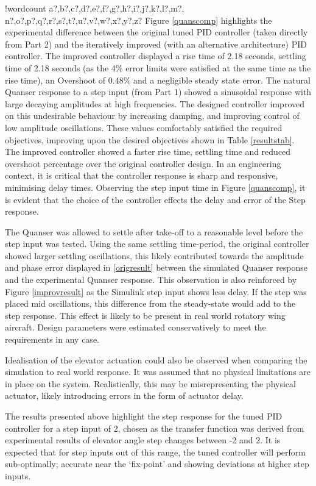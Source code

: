 \documentclass[11pt]{article}
\newcounter{words}
\newenvironment{counted}{%
  \setcounter{words}{0}
  \SearchList!{wordcount}{\stepcounter{words}}
    {a?,b?,c?,d?,e?,f?,g?,h?,i?,j?,k?,l?,m?,
    n?,o?,p?,q?,r?,s?,t?,u?,v?,w?,x?,y?,z?}
  \UndoBoundary{'}
  \SearchOrder{p;}}{%
  \StopSearching}
\begin{document}
\begin{counted}
Figure \ref{quanscomp} highlights the experimental difference between
the original tuned PID controller (taken directly from Part 2) and the
iteratively improved (with an alternative architecture) PID controller.
The improved controller displayed a rise time of 2.18 seconds, settling
time of 2.18 seconds (as the 4\% error limits were satisfied at the same
time as the rise time), an Overshoot of 0.48\% and a negligible steady
state error. The natural Quanser response to a step input (from Part 1)
showed a sinusoidal response with large decaying amplitudes at high
frequencies. The designed controller improved on this undesirable
behaviour by increasing damping, and improving control of low amplitude
oscillations. These values comfortably satisfied the required
objectives, improving upon the desired objectives shown in Table
\ref{resultstab}. The improved controller showed a faster rise time,
settling time and reduced overshoot percentage over the original
controller design. In an engineering context, it is critical that the
controller response is sharp and responsive, minimising delay times.
Observing the step input time in Figure \ref{quanscomp}, it is evident
that the choice of the controller effects the delay and error of the
Step response.

The Quanser was allowed to settle after take-off to a reasonable level
before the step input was tested. Using the same settling time-period,
the original controller showed larger settling oscillations, this likely
contributed towards the amplitude and phase error displayed in
\ref{origresult} between the simulated Quanser response and the
experimental Quanser response. This observation is also reinforced by
Figure \ref{improvresult} as the Simulink step input shows less delay.
If the step was placed mid oscillations, this difference from the
steady-state would add to the step response. This effect is likely to be
present in real world rotatory wing aircraft. Design parameters were
estimated conservatively to meet the requirements in any case.

Idealisation of the elevator actuation could also be observed when
comparing the simulation to real world response. It was assumed that no
physical limitations are in place on the system. Realistically, this may
be misrepresenting the physical actuator, likely introducing errors in
the form of actuator delay.

The results presented above highlight the step response for the tuned
PID controller for a step input of 2, chosen as the transfer function
was derived from experimental results of elevator angle step changes
between -2 and 2. It is expected that for step inputs out of this range,
the tuned controller will perform sub-optimally; accurate near the
`fix-point' and showing deviations at higher step inputs.


\end{counted}
\end{document}
